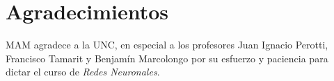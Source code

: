 \documentclass[aps,prl,twocolumn,groupedaddress]{revtex4-2}
\begin{document}
\section{Agradecimientos}

\begin{acknowledgments}
MAM agradece a la UNC, en especial a los profesores Juan Ignacio Perotti, Francisco Tamarit y Benjamín Marcolongo
por su esfuerzo y paciencia para dictar el curso de \textit{Redes Neuronales}.
\end{acknowledgments}

\end{document}
